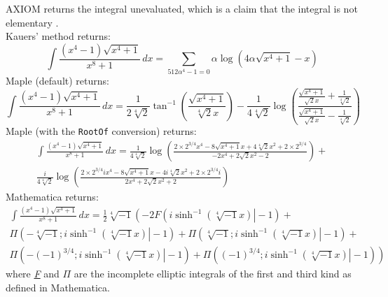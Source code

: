 \documentclass[12pt]{article}
\numberwithin{equation}{section}
\theoremstyle{definition}
\begin{document}
\bigskip

\noindent AXIOM returns the integral unevaluated, which is a claim that the integral is not elementary \cite[pp. 120]{Daly2005}. \\ 

\noindent Kauers' method returns: 
\small
$$\int \frac{\left(x^4-1\right) \sqrt{x^4+1}}{x^8+1} \, dx = 
\sum_{512 \alpha ^4-1=0}\alpha  \log \left(4 \alpha  \sqrt{x^4+1}-x\right)$$
\normalsize
Maple (default) returns:
\small
$$\int \frac{\left(x^4-1\right) \sqrt{x^4+1}}{x^8+1} \, dx = 
\frac{1}{2 \sqrt[4]{2}} \tan ^{-1}\left(\frac{\sqrt{x^4+1}}{\sqrt[4]{2} x}\right) - 
\frac{1}{4 \sqrt[4]{2}} \log\left(\frac{\frac{\sqrt{x^4+1}}{\sqrt{2} x}+\frac{1}{\sqrt[4]{2}}}{\frac{\sqrt{x^4+1}}{\sqrt{2} x}-\frac{1}{\sqrt[4]{2}}}\right)$$
\normalsize
Maple (with the \texttt{RootOf} conversion) returns:
\small
\begin{multline*}
\int \frac{\left(x^4-1\right) \sqrt{x^4+1}}{x^8+1} \, dx = 
\frac{1}{4 \sqrt[4]{2}}\log \left(\frac{2\times2^{3/4} x^4-8 \sqrt{x^4+1} x+4 \sqrt[4]{2} x^2+2\times2^{3/4}}{-2 x^4+2 \sqrt{2} x^2-2}\right) + \\
\frac{i}{4 \sqrt[4]{2}}\log \left(\frac{2\times2^{3/4} i x^4-8 \sqrt{x^4+1} x-4 i \sqrt[4]{2} x^2+2\times2^{3/4} i}{2 x^4+2 \sqrt{2} x^2+2}\right)
\end{multline*}
\normalsize
Mathematica returns:
\small
\begin{multline*}
\int \frac{\left(x^4-1\right) \sqrt{x^4+1}}{x^8+1} \, dx = \frac{1}{2} \sqrt[4]{-1} \left(-2 F\left(\left.i \sinh ^{-1}\left(\sqrt[4]{-1} x\right)\right|-1\right) \right. + \\
\Pi\left(-\sqrt[4]{-1};\left.i \sinh ^{-1}\left(\sqrt[4]{-1} x\right)\right|-1\right) + 
\Pi \left(\sqrt[4]{-1};\left.i \sinh ^{-1}\left(\sqrt[4]{-1} x\right)\right|-1\right) + \\
\left. \Pi\left(-(-1)^{3/4};\left.i \sinh ^{-1}\left(\sqrt[4]{-1} x\right)\right|-1\right)+\Pi \left((-1)^{3/4};\left.i \sinh ^{-1}\left(\sqrt[4]{-1} x\right)\right|-1\right)\right)
\end{multline*}
\normalsize
where \href{https://reference.wolfram.com/language/ref/EllipticF.html}{\textit{F}} and 
\href{https://reference.wolfram.com/language/ref/EllipticPi.html}{$\Pi$} are the incomplete 
elliptic integrals of the first and third kind as defined in Mathematica. \\
\end{document}
